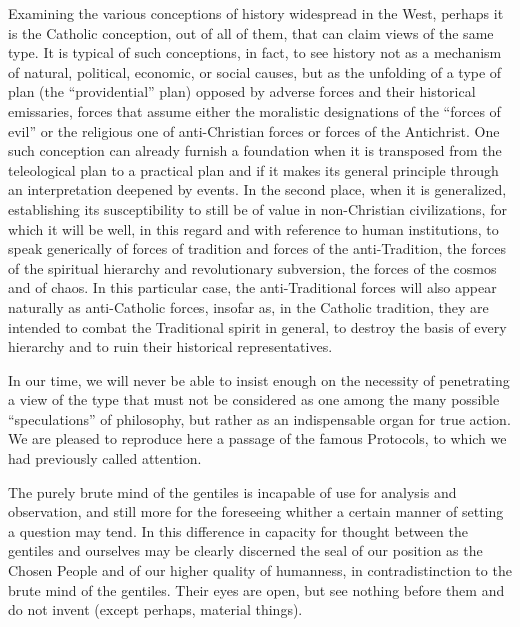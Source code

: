Examining the various conceptions of history widespread in the West, perhaps it is the Catholic conception, out of all of them, that can claim views of the same type. It is typical of such conceptions, in fact, to see history not as a mechanism of natural, political, economic, or social causes, but as the unfolding of a type of plan (the ``providential'' plan) opposed by adverse forces and their historical emissaries, forces that assume either the moralistic designations of the ``forces of evil'' or the religious one of anti-Christian forces or forces of the Antichrist. One such conception can already furnish a foundation when it is transposed from the teleological plan to a practical plan and if it makes its general principle through an interpretation deepened by events. In the second place, when it is generalized, establishing its susceptibility to still be of value in non-Christian civilizations, for which it will be well, in this regard and with reference to human institutions, to speak generically of forces of tradition and forces of the anti-Tradition, the forces of the spiritual hierarchy and revolutionary subversion, the forces of the cosmos and of chaos. In this particular case, the anti-Traditional forces will also appear naturally as anti-Catholic forces, insofar as, in the Catholic tradition, they are intended to combat the Traditional spirit in general, to destroy the basis of every hierarchy and to ruin their historical representatives.

In our time, we will never be able to insist enough on the necessity of penetrating a view of the type that must not be considered as one among the many possible ``speculations'' of philosophy, but rather as an indispensable organ for true action. We are pleased to reproduce here a passage of the famous Protocols, to which we had previously called attention.

\begin{quotex}
The purely brute mind of the gentiles is incapable of use for analysis and observation, and still more for the foreseeing whither a certain manner of setting a question may tend. In this difference in capacity for thought between the gentiles and ourselves may be clearly discerned the seal of our position as the Chosen People and of our higher quality of humanness, in contradistinction to the brute mind of the gentiles. Their eyes are open, but see nothing before them and do not invent (except perhaps, material things).
\end{quotex}



